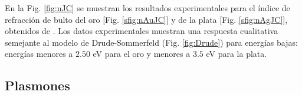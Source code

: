 







En la Fig.  \ref{fig:nJC} se muestran los resultados experimentales para el índice de refracción de bulto del oro [Fig.  \ref{sfig:nAuJC}] y de la plata [Fig.  \ref{sfig:nAgJC}], obtenidos de  \cite{johnson1972constants}.  Los datos experimentales muestran una respuesta cualitativa semejante al modelo de Drude-Sommerfeld (Fig.  \ref{fig:Drude}) para energías bajas: energías menores a $2. 50$ eV para el oro y menores a $3. 5$ eV para la plata. %




\subsection{Plasmones}

